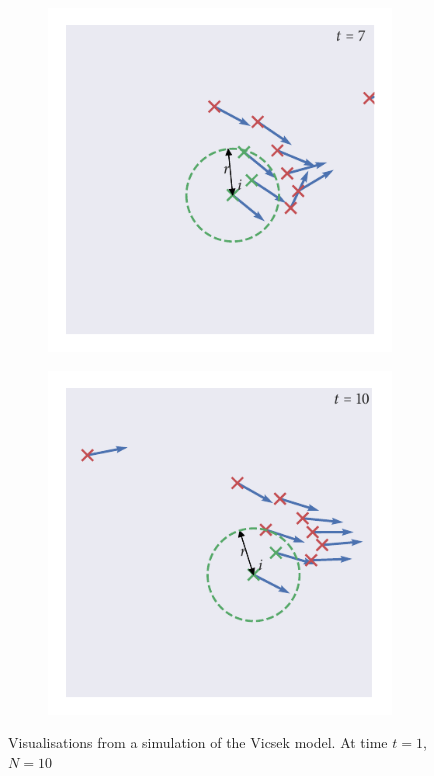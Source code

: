 \begin{figure}[tb]
    \begin{subfigure}[b]{0.5\textwidth} \includegraphics{vicsek_simulation_7.pdf}
    \end{subfigure}%
    \begin{subfigure}[b]{0.5\textwidth}
        \includegraphics{vicsek_simulation_10.pdf}
    \end{subfigure}
    \caption{Visualisations from a simulation of the Vicsek model. At time $t=1$, $N=10$
}
\end{figure}
